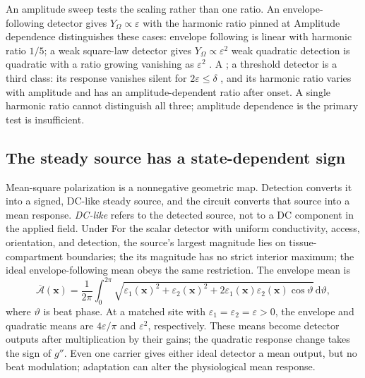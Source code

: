 \documentclass[11pt,a4paper]{article}
\providecommand{\DIFaddtex}[1]{{\protect\color{blue} \sf #1}} %
\providecommand{\DIFdeltex}[1]{{\protect\color{red} \scriptsize #1}} %
\providecommand{\DIFaddbegin}{} %
\providecommand{\DIFaddend}{} %
\providecommand{\DIFdelbegin}{} %
\providecommand{\DIFdelend}{} %
\providecommand{\DIFadd}[1]{\texorpdfstring{\DIFaddtex{#1}}{#1}} %
\providecommand{\DIFdel}[1]{\texorpdfstring{\DIFdeltex{#1}}{}} %
\begin{document}
\DIFdelbegin \DIFdel{An amplitude sweep tests the scaling rather than one ratio. An
envelope-following detector gives $Y_\Omega\propto\varepsilon$ with the harmonic ratio pinned at }\DIFdelend \DIFaddbegin \DIFadd{Amplitude dependence distinguishes these cases: envelope following is linear
with harmonic ratio }\DIFaddend $1/5$; \DIFdelbegin \DIFdel{a weak square-law detector gives $Y_\Omega\propto\varepsilon^2$ }\DIFdelend \DIFaddbegin \DIFadd{weak quadratic detection is quadratic }\DIFaddend with a ratio
\DIFdelbegin \DIFdel{growing }\DIFdelend \DIFaddbegin \DIFadd{vanishing }\DIFaddend as $\varepsilon^2$\DIFdelbegin \DIFdel{. A }\DIFdelend \DIFaddbegin \DIFadd{; a }\DIFaddend threshold detector is \DIFdelbegin \DIFdel{a third class: its
response vanishes }\DIFdelend \DIFaddbegin \DIFadd{silent }\DIFaddend for
$2\varepsilon\le\delta$ \DIFdelbegin \DIFdel{, and its harmonic ratio varies
with amplitude }\DIFdelend \DIFaddbegin \DIFadd{and has an amplitude-dependent ratio }\DIFaddend after onset.
A single harmonic ratio \DIFdelbegin \DIFdel{cannot distinguish all
three; amplitude dependence is the primary test}\DIFdelend \DIFaddbegin \DIFadd{is insufficient}\DIFaddend .

\subsection{The steady source has a state-dependent sign}\label{sec:dc}
Mean-square polarization is a nonnegative geometric map. Detection converts it
into a signed, DC-like steady source, and the circuit converts that source into a mean
response. \emph{DC-like} refers to the detected source, not to a DC component in the applied
field. \DIFdelbegin \DIFdel{Under }\DIFdelend \DIFaddbegin \DIFadd{For the scalar detector with }\DIFaddend uniform conductivity, access, orientation, and
detection, \DIFdelbegin \DIFdel{the source's
largest magnitude lies on tissue-compartment boundaries; the }\DIFdelend \DIFaddbegin \DIFadd{its magnitude has no strict interior maximum; the ideal
}\DIFaddend envelope-following mean obeys the same restriction.
The envelope mean is
\[
\overline{\mathcal A}(\mathbf x)=\frac{1}{2\pi}\int_0^{2\pi}
\sqrt{\varepsilon_1(\mathbf x)^2+\varepsilon_2(\mathbf x)^2
+2\varepsilon_1(\mathbf x)\varepsilon_2(\mathbf x)\cos\vartheta}\,\mathrm d\vartheta,
\]
where $\vartheta$ is beat phase. At a matched site with
$\varepsilon_1=\varepsilon_2=\varepsilon>0$, the envelope and quadratic means are
$4\varepsilon/\pi$ and $\varepsilon^2$, respectively. These means become detector outputs after multiplication by their gains; the
quadratic response change takes the sign of $g''$.
Even one carrier gives either ideal detector a mean output, but no beat modulation;
adaptation can alter the physiological mean response.
\end{document}

